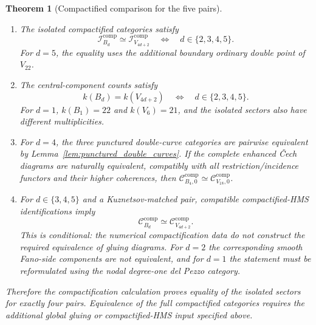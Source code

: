 \documentclass[11pt]{amsart}
\newtheorem{theorem}{Theorem}[section]
\theoremstyle{definition}
\theoremstyle{remark}
\newcommand{\CcompB}{\mathcal C^{\mathrm{comp}}_{B_4,0}}
\newcommand{\CcompV}{\mathcal C^{\mathrm{comp}}_{V_{18},0}}
\begin{document}
\begin{theorem}[Compactified comparison for the five pairs]
\begin{enumerate}[label=\textup{(\alph*)}]
resolved central fiber has $21$ components.  For $V_{22}$, three nodes lie
away from the base locus and the fourth is created by blowing up the line
$T=Y+Z=0$; the pencil is Lefschetz.
\item The isolated compactified categories satisfy
\[
\mathcal I_{B_d}^{\mathrm{comp}}
\simeq
\mathcal I_{V_{4d+2}}^{\mathrm{comp}}
\quad\Longleftrightarrow\quad
d\in\{2,3,4,5\}.
\]
For $d=5$, the equality uses the additional boundary ordinary double point of
$V_{22}$.
\item The central-component counts satisfy
\[
k(B_d)=k(V_{4d+2})
\quad\Longleftrightarrow\quad
d\in\{2,3,4,5\}.
\]
For $d=1$, $k(B_1)=22$ and $k(V_6)=21$, and the isolated sectors also have
different multiplicities.
\item For $d=4$, the three punctured double-curve categories are pairwise
equivalent by Lemma~\ref{lem:punctured_double_curves}.  If the complete
enhanced Čech diagrams are naturally equivalent, compatibly with all
restriction/incidence functors and their higher coherences, then
$\CcompB\simeq\CcompV$.
\item For $d\in\{3,4,5\}$ and a Kuznetsov-matched pair, compatible
compactified-HMS identifications imply
\[
\mathcal C^{\mathrm{comp}}_{B_d}
\simeq
\mathcal C^{\mathrm{comp}}_{V_{4d+2}}.
\]
This is conditional: the numerical compactification data do not construct
the required equivalence of gluing diagrams.  For $d=2$ the corresponding
smooth Fano-side components are not equivalent, and for $d=1$ the statement
must be reformulated using the nodal degree-one del Pezzo category.
\end{enumerate}
Therefore the compactification calculation proves equality of the isolated
sectors for exactly four pairs.  Equivalence of the full compactified
categories requires the additional global gluing or compactified-HMS input
specified above.
\end{theorem}
\end{document}
